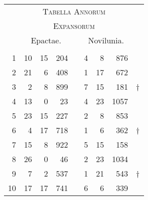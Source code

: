 %
\begin{tabnums} %
\footnotesize
\centering
\setlength{\tabcolsep}{1.0ex}
%
\newcommand{\cwd}{3.2em}
\newcommand{\da}{{\tiny †}}
\newcommand{\db}{{\scriptsize o}}
\newcommand{\ang}{90}
\newcommand{\hsb}[1]{\small{#1}}
\newcommand{\hsa}[1]{\tiny{#1}}
%
\newcommand{\hdrB}{%
  ~ &
  \multicolumn{3}{c}{\hsb{Epactae.}} &
  &
  \multicolumn{3}{c}{\hsb{Novilunia.}}  
}
%
\newcommand{\hdrA}{%
  \ch{888}{\hsa{Anni expansi}} &
  \ch{81}{\hsa{Epact.}}&
  \ch{88}{\hsa{Hor.}} &
  \ch{1888}{\hsa{Scrup.}} &
  &
  \ch{81}{\hsa{Feria.}} &
  \ch{88}{\hsa{Hor.}} &
  \ch{1888}{\hsa{Scrup.}}
}
%
\newcommand{\hdrs}{%
\hdrB \\
\cmidrule(lr){2-4} \cmidrule(lr){6-8}
\hdrA \\
}
%
\begin{tabular}[c]{@{} r rrr c rrr l@{}}
\toprule
\multicolumn{9}{c}{\Large\textsc{Tabella Annorum}} \\
\multicolumn{9}{c}{\large\textsc{Expansorum}} \\
\toprule
\hdrs %
\midrule
 1 & 10 & 15 &  204 && 4 &  8 &  876 & ~\\
 2 & 21 &  6 &  408 && 1 & 17 &  672 & ~\\
 3 &  2 &  8 &  899 && 7 & 15 &  181 & \da \\
 4 & 13 &  0 &   23 && 4 & 23 & 1057 & ~\\
 5 & 23 & 15 &  227 && 2 &  8 &  853 & ~\\
 6 &  4 & 17 &  718 && 1 &  6 &  362 & \da \\
 7 & 15 &  8 &  922 && 5 & 15 &  158 & ~\\
 8 & 26 &  0 &   46 && 2 & 23 & 1034 & ~\\
 9 &  7 &  2 &  537 && 1 & 21 &  543 & \da \\
10 & 17 & 17 &  741 && 6 &  6 &  339 & ~\\

\end{tabular}
\end{tabnums}
